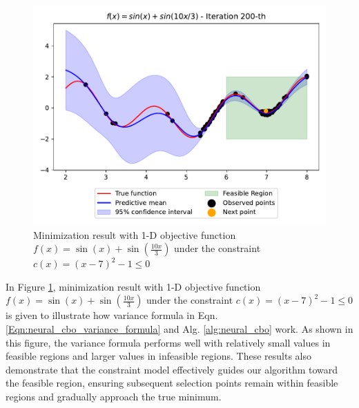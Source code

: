 \begin{figure}[h]
    \centering
   \includegraphics[width=\textwidth]{Figures/Neural-CBO/1d_toy.pdf}
    \caption{Minimization result with 1-D objective function $f(x) = \sin(x) + \sin(\frac{10x}{3})$ under the constraint $c(x) = (x-7)^2 -1 \le 0$}
    \label{fig:neural_cbo_toy_sample}
\end{figure}
In Figure \ref{fig:neural_cbo_toy_sample}, minimization result with 1-D objective function $f(x) = \sin(x) + \sin(\frac{10x}{3})$ under the constraint $c(x) = (x-7)^2 -1 \le 0$ is given to illustrate how variance formula in Eqn. \ref{Eqn:neural_cbo_variance_formula} and Alg. \ref{alg:neural_cbo} work. As shown in this figure, the variance formula performs well with relatively small values in feasible regions and larger values in infeasible regions. These results also demonstrate that the constraint model effectively guides our algorithm toward the feasible region, ensuring subsequent selection points remain within feasible regions and gradually approach the true minimum. 



